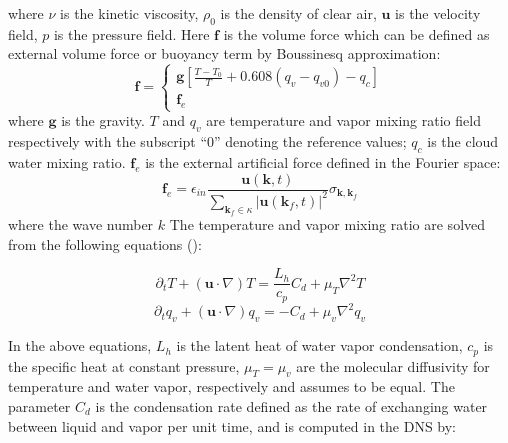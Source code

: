 \documentclass[12pt]{article}
\begin{document}
where $\nu$ is the kinetic viscosity, $\rho_{0}$ is the density of
clear air, $\mathbf{u}$ is the velocity field, $p$ is the pressure field. Here $\mathbf{f}$ is the volume force which can be defined as external volume force or  buoyancy term by Boussinesq approximation:
$$
\mathbf{f}= \left\{ 
\begin{array}{l}
\mathbf{g}[\frac{T-T_{0}}{T}+0.608(q_{v}-q_{v0})-q_{c}]\\
\mathbf{f}_e
\end{array} 
\right.
$$
where $\mathbf{g}$ is the gravity. $T$ and $q_{v}$ are temperature
and vapor mixing ratio field respectively with the subscript ``$0$''
denoting the reference values; $q_{c}$ is the cloud water mixing
ratio. $\mathbf{f}_e$ is the external artificial force defined in the Fourier 
space:
\begin{equation}
\mathbf{f}_e = \epsilon_{in}\frac{\mathbf{u}(\mathbf{k},t)}
{\sum_{\mathbf{k}_f\in \kappa}|\mathbf{u}(\mathbf{k}_f,t)|^2}
\sigma_{\mathbf{k},\mathbf{k}_f}
\end{equation}
where the wave number $k$
The temperature and vapor mixing ratio are solved from the following
equations (\cite{Kumar11}):

\begin{equation}
\partial_{t}T+(\mathbf{u}\cdot\nabla)T=\frac{L_{h}}{c_{p}}C_{d}+\mu_{T}\nabla^{2}T\label{eq:Temp}
\end{equation}
\begin{equation}
\partial_{t}q_{v}+(\mathbf{u}\cdot\nabla)q_{v}=-C_{d}+\mu_{v}\nabla^{2}q_{v}\label{eq:Vapor}
\end{equation}


In the above equations, $L_{h}$ is the latent heat of water vapor condensation,
$c_{p}$ is the specific heat at constant pressure, $\mu_{T}=\mu_{v}$ are
the molecular diffusivity for temperature and water vapor, respectively
and assumes to be equal. The parameter $C_{d}$ is the condensation
rate defined as the rate of exchanging water between liquid and vapor
per unit time, and is computed in the DNS by:
\end{document}
